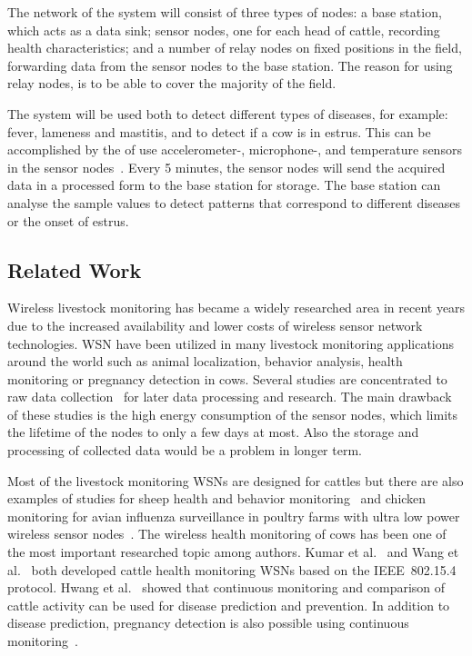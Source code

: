 \documentclass[conference]{IEEEtran}
\begin{document}
The network of the system will consist of three types of nodes: a base station,
which acts as a data sink; sensor nodes, one for each head of cattle, recording
health characteristics; and a number of relay nodes on fixed positions in the
field, forwarding data from the sensor nodes to the base station. The reason
for using relay nodes, is to be able to cover the majority of the field.

The system will be used both to detect different types of diseases, for
example: fever, lameness and mastitis, and to detect if a cow is in estrus.
This can be accomplished by the of use accelerometer-, microphone-, and
temperature sensors in the sensor nodes~\cite{hese2014}. Every 5 minutes, the
sensor nodes will send the acquired data in a processed form to the base
station for storage. The base station can analyse the sample values to detect
patterns that correspond to different diseases or the onset of estrus.

\subsection{Related Work}

Wireless livestock monitoring has became a widely researched area in recent
years due to the increased availability and lower costs of wireless sensor
network technologies. WSN have been utilized in many livestock monitoring
applications around the world such as animal localization, behavior analysis,
health monitoring or pregnancy detection in cows. Several studies are
concentrated to raw data collection~\cite{GU06AN,WA15IN} for later data
processing and research. The main drawback of these studies is the high energy
consumption of the sensor nodes, which limits the lifetime of the nodes to only
a few days at most.  Also the storage and processing of collected data would be
a problem in longer term.

Most of the livestock monitoring WSNs are designed for cattles \cite{GU06AN,
KU15AZ, SM06AN, SO05AW, MA14CA, HW11DE, WA15IN, KW12PR, PA15SO, NO13WI, HU10ZI,
KW09WI} but there are also examples of studies for sheep health and behavior
monitoring~\cite{NA12MO} and chicken monitoring for avian influenza
surveillance in poultry farms with ultra low power wireless sensor
nodes~\cite{OK12DE, OK13DE}. The wireless health monitoring of cows has been
one of the most important researched topic among authors. Kumar et
al.~\cite{KU15AZ} and Wang et al.~\cite{WA15IN} both developed cattle health
monitoring WSNs based on the IEEE~802.15.4 protocol. Hwang et al.~\cite{HW11DE}
showed that continuous monitoring and comparison of cattle activity can be used
for disease prediction and prevention. In addition to disease prediction,
pregnancy detection is also possible using continuous monitoring~\cite{NO13WI}.
\end{document}
